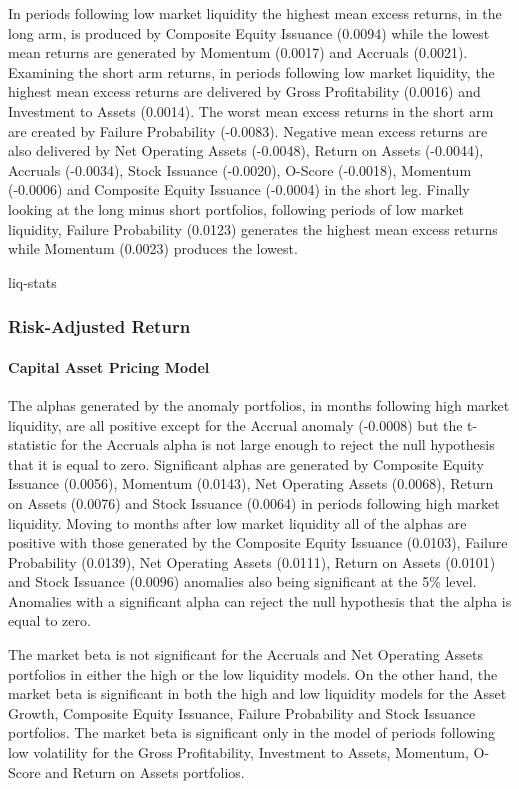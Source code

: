 \documentclass[12pt, a4paper, oneside]{article}
\begin{document}
In periods following low market liquidity the highest mean excess returns, in the long arm, is produced by Composite Equity Issuance (0.0094) while the lowest mean returns are generated by Momentum (0.0017) and Accruals (0.0021). Examining the short arm returns, in periods following low market liquidity, the highest mean excess returns are delivered by Gross Profitability (0.0016) and Investment to Assets (0.0014). The worst mean excess returns in the short arm are created by Failure Probability (-0.0083). Negative mean excess returns are also delivered by Net Operating Assets (-0.0048), Return on Assets (-0.0044), Accruals (-0.0034), Stock Issuance (-0.0020), O-Score (-0.0018), Momentum (-0.0006) and Composite Equity Issuance (-0.0004) in the short leg. Finally looking at the long minus short portfolios, following periods of low market liquidity, Failure Probability (0.0123) generates the highest mean excess returns while Momentum (0.0023) produces the lowest.

{liq-stats}

\subsubsection{Risk-Adjusted Return}
\paragraph{Capital Asset Pricing Model}
The alphas generated by the anomaly portfolios, in months following high market liquidity, are all positive except for the Accrual anomaly (-0.0008) but the t-statistic for the Accruals alpha is not large enough to reject the null hypothesis that it is equal to zero. Significant alphas are generated by Composite Equity Issuance (0.0056), Momentum (0.0143), Net Operating Assets (0.0068), Return on Assets (0.0076) and Stock Issuance (0.0064) in periods following high market liquidity. Moving to months after low market liquidity all of the alphas are positive with those generated by the Composite Equity Issuance (0.0103), Failure Probability (0.0139), Net Operating Assets (0.0111), Return on Assets (0.0101) and Stock Issuance (0.0096) anomalies also being significant at the 5\% level. Anomalies with a significant alpha can reject the null hypothesis that the alpha is equal to zero.

The market beta is not significant for the Accruals and Net Operating Assets portfolios in either the high or the low liquidity models. On the other hand, the market beta is significant in both the high and low liquidity models for the Asset Growth, Composite Equity Issuance, Failure Probability and Stock Issuance portfolios. The market beta is significant only in the model of periods following low volatility for the Gross Profitability, Investment to Assets, Momentum, O-Score and Return on Assets portfolios.
\end{document}
